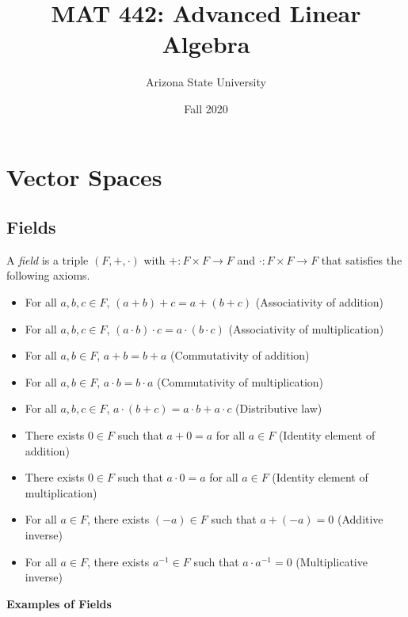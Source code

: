 \documentclass[12pt]{article}
\title{MAT 442: Advanced Linear Algebra}
\date{Fall 2020}
\author{Arizona State University}
\newenvironment{definition}[2][Definition]{\begin{trivlist}
\item[\hskip \labelsep {\bfseries #1}\hskip \labelsep {\bfseries #2}]}{\end{trivlist}}
\begin{document}

\maketitle
\newpage
\tableofcontents
\newpage


\section{Vector Spaces}

\subsection{Fields}

\begin{definition}{1}
A \textit{field} is a triple $(F, +, \cdot)$ with $+: F \times F \to F$ and $\cdot : F \times F \to F$ that satisfies the following axioms.
\begin{itemize}
    \item[(1)] For all $a,b,c \in F$, $(a + b) + c = a + (b + c)$ (Associativity of addition)
    \item[(2)] For all $a,b,c \in F$, $(a \cdot b) \cdot c = a \cdot (b \cdot c)$ (Associativity of multiplication)
    \item[(3)] For all $a,b \in F$, $a + b = b + a$ (Commutativity of addition)
    \item[(4)] For all $a,b \in F$, $a \cdot b = b \cdot a$ (Commutativity of multiplication)
    \item[(5)] For all $a,b,c \in F$, $a \cdot (b + c) = a \cdot b + a \cdot c$ (Distributive law)
    \item[(6)] There exists $0 \in F$ such that $a + 0 = a$ for all $a \in F$ (Identity element of addition)
    \item[(7)] There exists $0 \in F$ such that $a \cdot 0 = a$ for all $a \in F$ (Identity element of multiplication)
    \item[(8)] For all $a \in F$, there exists $(-a) \in F$ such that $a + (-a) = 0$ (Additive inverse)
    \item[(9)] For all $a \in F$, there exists $a^{-1} \in F$ such that $a \cdot a^{-1} = 0$ (Multiplicative inverse)
\end{itemize}
\end{definition}

\textbf{Examples of Fields}
\end{document}
